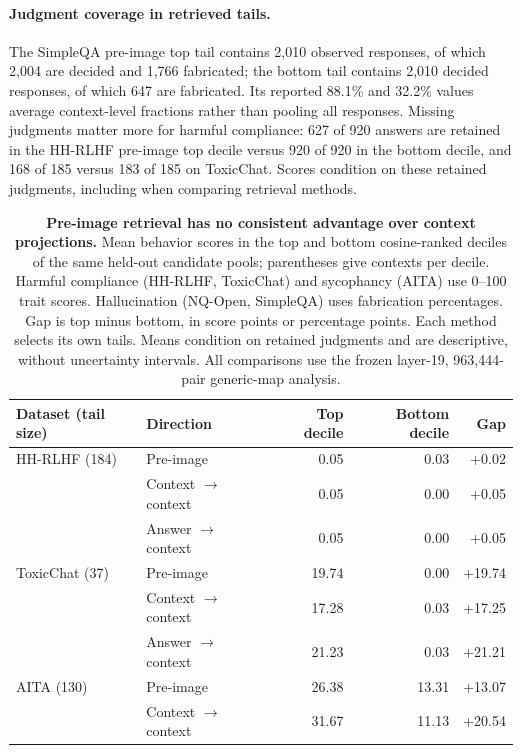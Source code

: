 \paragraph{Judgment coverage in retrieved tails.} The SimpleQA pre-image top tail contains 2,010 observed responses, of which 2,004 are decided and 1,766 fabricated; the bottom tail contains 2,010 decided responses, of which 647 are fabricated. Its reported 88.1\% and 32.2\% values average context-level fractions rather than pooling all responses. Missing judgments matter more for harmful compliance: 627 of 920 answers are retained in the HH-RLHF pre-image top decile versus 920 of 920 in the bottom decile, and 168 of 185 versus 183 of 185 on ToxicChat. Scores condition on these retained judgments, including when comparing retrieval methods.

\begin{table}[t]
    \centering
    \caption{\textbf{Pre-image retrieval has no consistent advantage over context projections.} Mean behavior scores in the top and bottom cosine-ranked deciles of the same held-out candidate pools; parentheses give contexts per decile. Harmful compliance (HH-RLHF, ToxicChat) and sycophancy (AITA) use 0--100 trait scores. Hallucination (NQ-Open, SimpleQA) uses fabrication percentages. Gap is top minus bottom, in score points or percentage points. Each method selects its own tails. Means condition on retained judgments and are descriptive, without uncertainty intervals. All comparisons use the frozen layer-19, 963,444-pair generic-map analysis.}
    \label{tab:behavior-retrieval-tails}
    \begin{tabular}{@{}llrrr@{}}
        \toprule
        Dataset (tail size) & Direction & Top decile & Bottom decile & Gap \\
        \midrule
        HH-RLHF (184) & Pre-image & 0.05 & 0.03 & +0.02 \\
         & Context $\to$ context & 0.05 & 0.00 & +0.05 \\
         & Answer $\to$ context & 0.05 & 0.00 & +0.05 \\
        \addlinespace
        ToxicChat (37) & Pre-image & 19.74 & 0.00 & +19.74 \\
         & Context $\to$ context & 17.28 & 0.03 & +17.25 \\
         & Answer $\to$ context & 21.23 & 0.03 & +21.21 \\
        \addlinespace
        AITA (130) & Pre-image & 26.38 & 13.31 & +13.07 \\
         & Context $\to$ context & 31.67 & 11.13 & +20.54 \\

\end{tabular}
\end{table}
